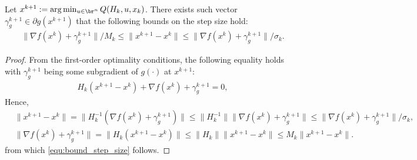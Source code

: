 \documentclass[11pt]{article}
\numberwithin{equation}{section}
\begin{document}
\begin{lemma}\label{lem:bound_step_size}
Let $x^{k+1}:=\arg\min_{u\in\br^n} Q(H_k, u,x_k)$. There exists such vector $\gamma_g^{k+1} \in \partial g(x^{k+1})$ that the following bounds on the step size hold: 
\begin{align}
    \label{equ:bound_step_size}
    \|\nabla f(x^k) + \gamma_g^{k+1}\| / M_k 
    \leq 
    \|x^{k+1} - x^k\| 
    \leq 
    \|\nabla f(x^k) + \gamma_g^{k+1}\| / \sigma_k.
\end{align}
\end{lemma}
\begin{proof}
     From the first-order optimality conditions, the following equality holds with $\gamma_g^{k+1}$ being some subgradient of $g(\cdot)$ at $x^{k+1}$: 
    \begin{align*}
        H_k(x^{k+1} - x^k) + \nabla f(x^k) + \gamma_g^{k+1} = 0,
    \end{align*}
    Hence,
    \begin{align*}
        &\|x^{k+1} - x^k\|
        = \| H_k^{-1}(\nabla f(x^k) + \gamma_g^{k+1}) \|
        \leq \| H_k^{-1} \| \|\nabla f(x^k) + \gamma_g^{k+1}\|
        \leq \|\nabla f(x^k) + \gamma_g^{k+1}\| / \sigma_k, \\
        &\|\nabla f(x^k) + \gamma_g^{k+1}\| 
        = \|H_k(x^{k+1} - x^k)\|
        \leq \|H_k\| \|x^{k+1} - x^k\|
        \leq M_k\|x^{k+1} - x^k\|.
    \end{align*}
    from which \eqref{equ:bound_step_size} follows.
\end{proof}
\end{document}
